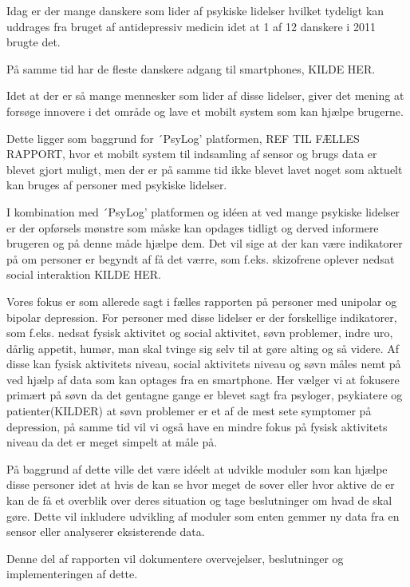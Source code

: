 Idag er der mange danskere som lider af psykiske lidelser hvilket tydeligt kan uddrages fra bruget af antidepressiv medicin idet at 1 af 12 danskere i 2011 brugte det. 


På samme tid har de fleste danskere adgang til smartphones, KILDE HER.

Idet at der er så mange mennesker som lider af disse lidelser, giver det mening at forsøge innovere i det område og lave et mobilt system som kan hjælpe brugerne.

Dette ligger som baggrund for ´PsyLog' platformen, REF TIL FÆLLES RAPPORT, hvor et mobilt system til indsamling af sensor og brugs data er blevet gjort muligt, men der er på samme tid ikke blevet lavet noget som aktuelt kan bruges af personer med psykiske lidelser.

I kombination med ´PsyLog' platformen og idéen at ved mange psykiske lidelser er der opførsels mønstre som måske kan opdages tidligt og derved informere brugeren og på denne måde hjælpe dem. 
Det vil sige at der kan være indikatorer på om personer er begyndt af få det værre, som f.eks. skizofrene oplever nedsat social interaktion KILDE HER.

Vores fokus er som allerede sagt i fælles rapporten på personer med unipolar og bipolar depression. 
For personer med disse lidelser er der forskellige indikatorer, som f.eks. nedsat fysisk aktivitet og social aktivitet, søvn problemer, indre uro, dårlig appetit, humør, man skal tvinge sig selv til at gøre alting og så videre.
Af disse kan fysisk aktivitets niveau, social aktivitets niveau og søvn måles nemt på ved hjælp af data som kan optages fra en smartphone. 
Her vælger vi at fokusere primært på søvn da det gentagne gange er blevet sagt fra psyloger, psykiatere og patienter(KILDER) at søvn problemer er et af de mest sete symptomer på depression, på samme tid vil vi også have en mindre fokus på fysisk aktivitets niveau da det er meget simpelt at måle på.

På baggrund af dette ville det være idéelt at udvikle moduler som kan hjælpe disse personer idet at hvis de kan se hvor meget de sover eller hvor aktive de er kan de få et overblik over deres situation og tage beslutninger om hvad de skal gøre. 
Dette vil inkludere udvikling af moduler som enten gemmer ny data fra en sensor eller analyserer eksisterende data.

Denne del af rapporten vil dokumentere overvejelser, beslutninger og implementeringen af dette.